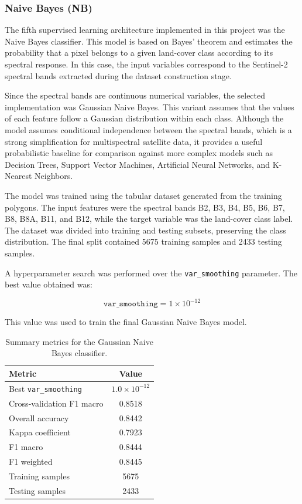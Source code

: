 \documentclass{article}
\begin{document}
\subsubsection{Naive Bayes (NB)}
The fifth supervised learning architecture implemented in this project was the Naive Bayes classifier. This model is based on Bayes' theorem and estimates the probability that a pixel belongs to a given land-cover class according to its spectral response. In this case, the input variables correspond to the Sentinel-2 spectral bands extracted during the dataset construction stage.

Since the spectral bands are continuous numerical variables, the selected implementation was Gaussian Naive Bayes. This variant assumes that the values of each feature follow a Gaussian distribution within each class. Although the model assumes conditional independence between the spectral bands, which is a strong simplification for multispectral satellite data, it provides a useful probabilistic baseline for comparison against more complex models such as Decision Trees, Support Vector Machines, Artificial Neural Networks, and K-Nearest Neighbors.

The model was trained using the tabular dataset generated from the training polygons. The input features were the spectral bands B2, B3, B4, B5, B6, B7, B8, B8A, B11, and B12, while the target variable was the land-cover class label. The dataset was divided into training and testing subsets, preserving the class distribution. The final split contained 5675 training samples and 2433 testing samples.

A hyperparameter search was performed over the \texttt{var\_smoothing} parameter. The best value obtained was:

\begin{equation}
\texttt{var\_smoothing} = 1 \times 10^{-12}
\end{equation}

This value was used to train the final Gaussian Naive Bayes model.

\begin{table}[H]
\centering
\caption{Summary metrics for the Gaussian Naive Bayes classifier.}
\label{tab:nb_summary_metrics}
\begin{tabular}{lc}
\toprule
\textbf{Metric} & \textbf{Value} \\
\midrule
Best \texttt{var\_smoothing} & $1.0 \times 10^{-12}$ \\
Cross-validation F1 macro & 0.8518 \\
Overall accuracy & 0.8442 \\
Kappa coefficient & 0.7923 \\
F1 macro & 0.8444 \\
F1 weighted & 0.8445 \\
Training samples & 5675 \\
Testing samples & 2433 \\
\bottomrule
\end{tabular}
\end{table}
\end{document}
